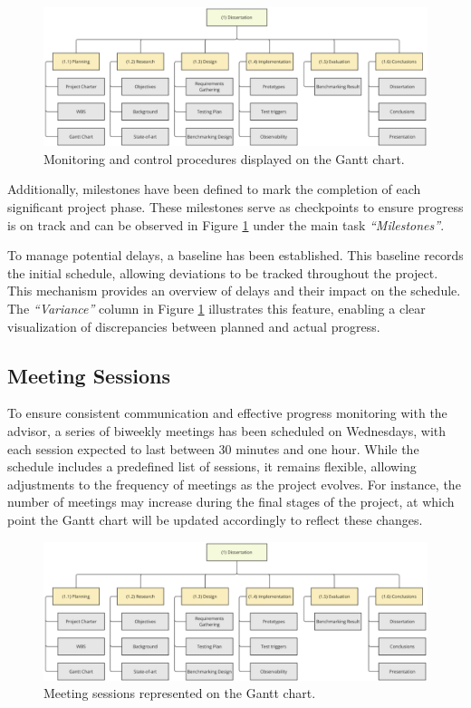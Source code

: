 \begin{figure}
      \centering
      \includegraphics[width=\linewidth]{ch-planning/assets/wbs.png}
      \caption{Monitoring and control procedures displayed on the Gantt chart.}
      \label{fig:gantt_monitoring}
\end{figure}

Additionally, milestones have been defined to mark the completion of each significant project phase. These milestones serve as checkpoints to ensure progress is on track and can be observed in Figure \ref{fig:gantt_monitoring} under the main task \textit{“Milestones”}.

To manage potential delays, a baseline has been established. This baseline records the initial schedule, allowing deviations to be tracked throughout the project. This mechanism provides an overview of delays and their impact on the schedule. The \textit{“Variance”} column in Figure \ref{fig:gantt_monitoring} illustrates this feature, enabling a clear visualization of discrepancies between planned and actual progress.

\subsection{Meeting Sessions}

To ensure consistent communication and effective progress monitoring with the advisor, a series of biweekly meetings has been scheduled on Wednesdays, with each session expected to last between 30 minutes and one hour. While the schedule includes a predefined list of sessions, it remains flexible, allowing adjustments to the frequency of meetings as the project evolves. For instance, the number of meetings may increase during the final stages of the project, at which point the Gantt chart will be updated accordingly to reflect these changes.

\begin{figure}
      \centering
      \includegraphics[width=\linewidth]{ch-planning/assets/wbs.png}
      \caption{Meeting sessions represented on the Gantt chart.}
      \label{fig:gantt_meetings}
\end{figure}

